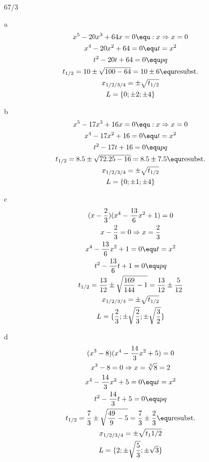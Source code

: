 \begin{exercise}{67/3}
  \item [a]
  \begin{gather*}
    x^5 - 20x^3 + 64x = 0 \equ :x \Rightarrow x = 0 \\
    x^4 - 20x^2 + 64 = 0 \equ t = x^2 \\
    t^2 - 20t + 64 = 0 \equ pq \\
    t_{1/2} = 10 \pm \sqrt{100 - 64} = 10 \pm 6 \equ \text{resubst.} \\
    x_{1/2/3/4} = \pm \sqrt{t_{1/2}} \\
    L = \{0; \pm2; \pm4\}
  \end{gather*}
  \item [b]
  \begin{gather*}
    x^5 - 17x^3 + 16x = 0 \equ :x \Rightarrow x = 0 \\
    x^4 - 17x^2 + 16 = 0 \equ t = x^2 \\
    t^2 - 17t + 16 = 0 \equ pq \\
    t_{1/2} = 8.5 \pm \sqrt{72.25 - 16} = 8.5 \pm 7.5 \equ \text{resubst.} \\
    x_{1/2/3/4} = \pm \sqrt{t_{1/2}} \\
    L = \{0; \pm1; \pm4\}
  \end{gather*}
  \item [c]
  \begin{gather*}
    (x - \frac{2}{3})(x^4 - \frac{13}{6}x^2 + 1) = 0 \\
    x - \frac{2}{3} = 0 \Rightarrow x = \frac{2}{3} \\
    x^4 - \frac{13}{6}x^2 + 1 = 0 \equ t = x^2 \\
    t^2 - \frac{13}{6}t + 1 = 0 \equ pq \\
    t_{1/2} = \frac{13}{12} \pm \sqrt{\frac{169}{144} - 1} = \frac{13}{12} \pm \frac{5}{12} \\
    x_{1/2/3/4} = \pm \sqrt{t_{1/2}} \\
    L = \{\frac{2}{3}; \pm \sqrt{\frac{2}{3}}; \pm \sqrt{\frac{3}{2}}\}
  \end{gather*}
  \item [d]
  \begin{gather*}
    (x^3 - 8)(x^4 - \frac{14}{3}x^2 + 5) = 0 \\
    x^3 - 8 = 0 \Rightarrow x = \sqrt[3]{8} = 2 \\
    x^4 - \frac{14}{3}x^2 + 5 = 0 \equ t = x^2 \\
    t^2 - \frac{14}{3}t + 5 = 0 \equ pq \\
    t_{1/2} = \frac{7}{3} \pm \sqrt{\frac{49}{9} - 5} = \frac{7}{3} \pm \frac{2}{3} \equ \text{resubst.} \\
    x_{1/2/3/4} = \pm \sqrt{t_1{1/2}} \\
    L = \{2; \pm \sqrt{\frac{5}{3}}; \pm \sqrt{3}\}
  \end{gather*}
\end{exercise}

